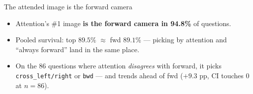 \documentclass[aspectratio=169]{beamer}
\begin{document}
\begin{frame}{The attended image is the forward camera}
\centering
{}
\par\vspace{2pt}
\begin{itemize}\footnotesize
\item Attention's \#1 image \textbf{is the forward camera in 94.8\%} of questions.
\item Pooled survival: \textcolor{ours}{top} $89.5\%$ $\approx$
 \textcolor{fwdc}{fwd} $89.1\%$ --- picking by attention and ``always forward''
 land in the same place.
\item On the $86$ questions where attention \emph{disagrees} with forward, it picks
 \texttt{cross\_left/right} or \texttt{bwd} --- and trends ahead of fwd
 ($+9.3$ pp, CI touches 0 at $n{=}86$).
\end{itemize}
\end{frame}
\end{document}
